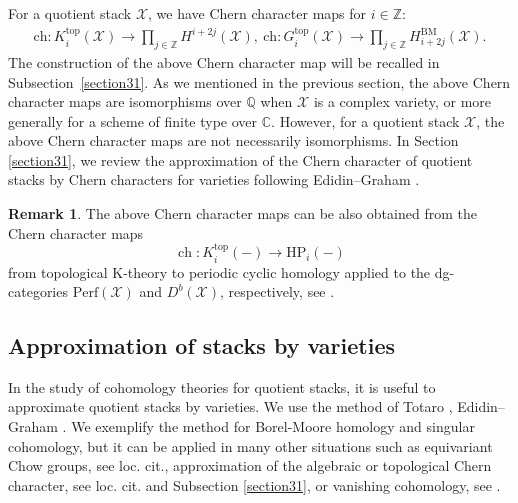 \documentclass [11pt,oneside,a4paper,mathscr]{amsart}
\theoremstyle{definition}
\newtheorem{remark}[thm]{Remark}
\newcommand{\X}{\mathscr{X}}
\newcommand{\ch}{\operatorname{ch}}
\begin{document}
For a quotient stack $\X$, we have Chern character maps for $i\in\mathbb{Z}$:
\begin{align*}
    \mathrm{ch}\colon K^{\mathrm{top}}_i(\X)\to \prod_{j\in\mathbb{Z}}H^{i+2j}(\X),\
    \mathrm{ch}\colon G^{\mathrm{top}}_i(\X)\to \prod_{j\in\mathbb{Z}}H_{i+2j}^{\mathrm{BM}}(\X).
\end{align*}
The construction of the above Chern character map will be recalled in 
Subsection~\ref{section31}. 
As we mentioned in the previous section, 
the above Chern character maps are 
isomorphisms over $\mathbb{Q}$ 
when $\X$ is a complex variety, 
or more generally for a scheme of finite 
type over $\mathbb{C}$. 
However, for a quotient stack $\X$, the 
above Chern character maps are not necessarily isomorphisms. 
In Section \ref{section31}, we review the approximation of the Chern character of quotient stacks by Chern characters for varieties following Edidin--Graham \cite{EdidinGraham}.

\begin{remark}
The above Chern character maps can be also obtained from the Chern character 
maps
\[\ch \colon K^{\mathrm{top}}_i(-)\to \mathrm{HP}_i(-)\] from topological K-theory to periodic cyclic homology applied to the dg-categories $\mathrm{Perf}(\X)$ and $D^b(\X)$, respectively, see \cite[Section 4.4]{Blanc}.
\end{remark}




\subsection{Approximation of stacks by varieties}\label{subsub25}

In the study of cohomology theories for quotient stacks, it is useful to 
approximate quotient stacks by varieties. We use the method of Totaro \cite{Totaro}, Edidin--Graham \cite{EdidinGraham}. 
We exemplify the method for Borel-Moore homology and singular cohomology, but it can be applied in many other situations such as equivariant Chow groups, see loc. cit., approximation of the algebraic or topological Chern character, see loc. cit. and Subsection \ref{section31}, or vanishing cohomology, see \cite[Subsection 2.2]{DM}.
\end{document}
